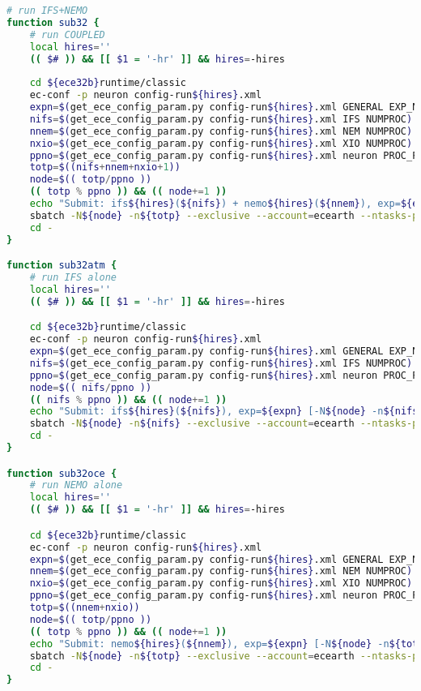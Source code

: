 \begin{lstlisting}[caption={Run functions},label={app:run},language=Bash]
# run IFS+NEMO
function sub32 {
    # run COUPLED
    local hires=''
    (( $# )) && [[ $1 = '-hr' ]] && hires=-hires
    
    cd ${ece32b}runtime/classic
    ec-conf -p neuron config-run${hires}.xml
    expn=$(get_ece_config_param.py config-run${hires}.xml GENERAL EXP_NAME)  ||  return 1
    nifs=$(get_ece_config_param.py config-run${hires}.xml IFS NUMPROC)    ||  return 1
    nnem=$(get_ece_config_param.py config-run${hires}.xml NEM NUMPROC)    ||  return 1
    nxio=$(get_ece_config_param.py config-run${hires}.xml XIO NUMPROC)    ||  return 1
    ppno=$(get_ece_config_param.py config-run${hires}.xml neuron PROC_PER_NODE) ||  return 1 
    totp=$((nifs+nnem+nxio+1))
    node=$(( totp/ppno ))
    (( totp % ppno )) && (( node+=1 ))
    echo "Submit: ifs${hires}(${nifs}) + nemo${hires}(${nnem}), exp=${expn} [-N${node} -n${totp} --ntasks-per-node=${ppno}]"
    sbatch -N${node} -n${totp} --exclusive --account=ecearth --ntasks-per-node=${ppno} -o "out/${expn}${hires}.out.001" -e "out/${expn}${hires}.err.001" ./ece-ifs+nemo.sh
    cd -
}

function sub32atm {
    # run IFS alone
    local hires=''
    (( $# )) && [[ $1 = '-hr' ]] && hires=-hires

    cd ${ece32b}runtime/classic
    ec-conf -p neuron config-run${hires}.xml
    expn=$(get_ece_config_param.py config-run${hires}.xml GENERAL EXP_NAME)  ||  return 1
    nifs=$(get_ece_config_param.py config-run${hires}.xml IFS NUMPROC)    ||  return 1
    ppno=$(get_ece_config_param.py config-run${hires}.xml neuron PROC_PER_NODE) ||  return 1
    node=$(( nifs/ppno ))
    (( nifs % ppno )) && (( node+=1 ))
    echo "Submit: ifs${hires}(${nifs}), exp=${expn} [-N${node} -n${nifs} --ntasks-per-node=${ppno}]"
    sbatch -N${node} -n${nifs} --exclusive --account=ecearth --ntasks-per-node=${ppno} -o "out/${expn}${hires}.out.001" -e "out/${expn}${hires}.err.001" ./ece-ifs.sh
    cd -
}

function sub32oce {
    # run NEMO alone
    local hires=''
    (( $# )) && [[ $1 = '-hr' ]] && hires=-hires

    cd ${ece32b}runtime/classic
    ec-conf -p neuron config-run${hires}.xml
    expn=$(get_ece_config_param.py config-run${hires}.xml GENERAL EXP_NAME)  ||  return 1
    nnem=$(get_ece_config_param.py config-run${hires}.xml NEM NUMPROC)    ||  return 1
    nxio=$(get_ece_config_param.py config-run${hires}.xml XIO NUMPROC)    ||  return 1
    ppno=$(get_ece_config_param.py config-run${hires}.xml neuron PROC_PER_NODE) ||  return 1
    totp=$((nnem+nxio))
    node=$(( totp/ppno ))
    (( totp % ppno )) && (( node+=1 ))
    echo "Submit: nemo${hires}(${nnem}), exp=${expn} [-N${node} -n${totp} --ntasks-per-node=${ppno}]"
    sbatch -N${node} -n${totp} --exclusive --account=ecearth --ntasks-per-node=${ppno} -o "out/${expn}${hires}.out.001" -e "out/${expn}${hires}.err.001" ./ece-nemo.sh
    cd -
}
\end{lstlisting}



